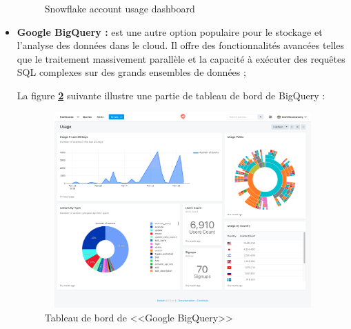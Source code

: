 \begin{itemize}
\begin{figure}[H]
            \caption{Snowflake account usage dashboard}
            \label{fig:info}
            \end{figure}
    \item\textbf{Google BigQuery :} est une autre option populaire pour le stockage et l'analyse des données dans le cloud. 
    Il offre des fonctionnalités avancées telles que le traitement massivement parallèle et la capacité à exécuter des requêtes SQL complexes sur des grands ensembles de données ;
    \par La figure \textbf{\ref{fig:BQ}} suivante illustre une partie de tableau de bord de BigQuery :
            \begin{figure}[H]
            \centering
            \includegraphics[width =13cm, height=7.5cm]{img/captures/bigquery}
            \caption{Tableau de bord de <<Google BigQuery>>}
            \label{fig:BQ}
            \end{figure}


\end{itemize}
